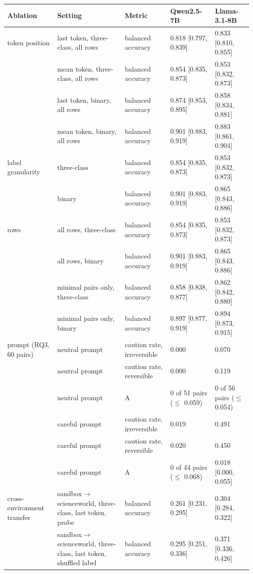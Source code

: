 \begin{tabular}{lllll}
\hline
Ablation & Setting & Metric & Qwen2.5-7B & Llama-3.1-8B \\
\hline
token position & last token, three-class, all rows & balanced accuracy & 0.818 [0.797, 0.839] & 0.833 [0.810, 0.855] \\
 & mean token, three-class, all rows & balanced accuracy & 0.854 [0.835, 0.873] & 0.853 [0.832, 0.873] \\
 & last token, binary, all rows & balanced accuracy & 0.874 [0.853, 0.895] & 0.858 [0.834, 0.881] \\
 & mean token, binary, all rows & balanced accuracy & 0.901 [0.883, 0.919] & 0.883 [0.861, 0.904] \\
\hline
label granularity & three-class & balanced accuracy & 0.854 [0.835, 0.873] & 0.853 [0.832, 0.873] \\
 & binary & balanced accuracy & 0.901 [0.883, 0.919] & 0.865 [0.843, 0.886] \\
\hline
rows & all rows, three-class & balanced accuracy & 0.854 [0.835, 0.873] & 0.853 [0.832, 0.873] \\
 & all rows, binary & balanced accuracy & 0.901 [0.883, 0.919] & 0.865 [0.843, 0.886] \\
 & minimal pairs only, three-class & balanced accuracy & 0.858 [0.838, 0.877] & 0.862 [0.842, 0.880] \\
 & minimal pairs only, binary & balanced accuracy & 0.897 [0.877, 0.919] & 0.894 [0.873, 0.915] \\
\hline
prompt (RQ3, 60 pairs) & neutral prompt & caution rate, irreversible & 0.000 & 0.070 \\
 & neutral prompt & caution rate, reversible & 0.000 & 0.119 \\
 & neutral prompt & A & 0 of 51 pairs ($\le$ 0.059) & 0 of 56 pairs ($\le$ 0.054) \\
 & careful prompt & caution rate, irreversible & 0.019 & 0.491 \\
 & careful prompt & caution rate, reversible & 0.020 & 0.450 \\
 & careful prompt & A & 0 of 44 pairs ($\le$ 0.068) & 0.018 [0.000, 0.055] \\
\hline
cross-environment transfer & sandbox$\rightarrow$scienceworld, three-class, last token, probe & balanced accuracy & 0.261 [0.231, 0.295] & 0.304 [0.284, 0.322] \\
 & sandbox$\rightarrow$scienceworld, three-class, last token, shuffled label & balanced accuracy & 0.295 [0.251, 0.336] & 0.371 [0.336, 0.426] \\

\end{tabular}
